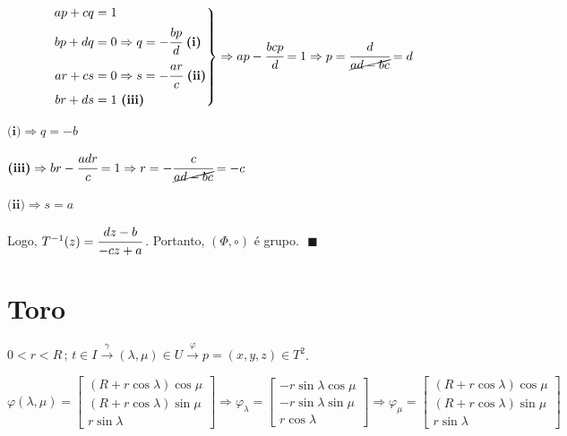 \documentclass[10pt,a4paper]{article}
\begin{document}
		\begin{equation*}
			\left.\begin{aligned}
			    ap + cq &= 1    \\
			    bp + dq &= 0 \Rightarrow q = -\cfrac{bp}{d} \,\,\textbf{(i)}  \\
			    ar + cs &= 0 \Rightarrow s = -\cfrac{ar}{c} \,\,\textbf{(ii)}   \\
			    br + ds &= 1 \,\,\textbf{(iii)}
			\end{aligned}
			\right\} \Rightarrow ap - \cfrac{bcp}{d} = 1 \Rightarrow p = \cfrac{d}{\cancel{ad - bc}} = d
		\end{equation*}

		$\textbf{(i)} \Rightarrow q = -b$

		$\textbf{(iii)} \Rightarrow br - \cfrac{adr}{c} = 1 \Rightarrow r = -\cfrac{c}{\cancel{ad - bc}} = -c$

		$\textbf{(ii)} \Rightarrow s = a$

		Logo, $T^{-1}(z) = \cfrac{dz - b}{-cz + a}\,$. Portanto, $(\Phi, \circ)$ \'e grupo. $\,\,\blacksquare$

\section{Toro}
		\begin{flushright}
		\end{flushright}

		$0 < r < R\,;\,t \in I \stackrel{\gamma}{\longrightarrow} (\lambda,\mu) \in U \stackrel{\varphi}{\longrightarrow} p = (x,y,z) \in T^2$.

		$\varphi(\lambda, \mu) = \left[ \begin{matrix} (R + r \cos \lambda) \cos \mu \\ (R + r \cos \lambda) \sin \mu \\ r \sin \lambda \end{matrix} \right] \Rightarrow \varphi_\lambda = \left[ \begin{matrix} - r \sin \lambda \cos \mu \\ - r \sin \lambda \sin \mu \\ r \cos \lambda \end{matrix} \right] \Rightarrow \varphi_\mu = \left[ \begin{matrix} (R + r \cos \lambda) \cos \mu \\ (R + r \cos \lambda) \sin \mu \\ r \sin \lambda \end{matrix} \right]$
\end{document}
